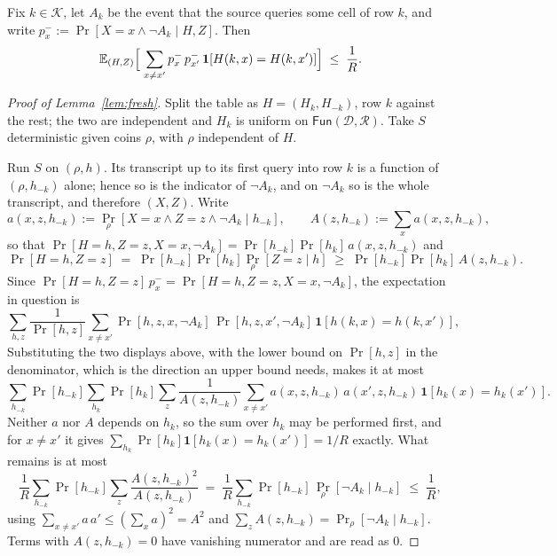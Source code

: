 \documentclass{aicr-solution}
\newcommand{\Fun}{\mathsf{Fun}}
\newcommand{\calK}{\mathcal{K}}
\newcommand{\calD}{\mathcal{D}}
\newcommand{\calR}{\mathcal{R}}
\begin{document}
\begin{lemma}\label{lem:fresh}
Fix $k \in \calK$, let $A_k$ be the event that the source queries some cell of row $k$, and write
$p^{-}_{x} := \Pr[X = x \wedge \neg A_k \mid H, Z]$. Then
\[
  \mathbb{E}_{(H,Z)}\Bigl[\;\sum_{x \neq x'} p^{-}_{x}\,p^{-}_{x'}\,
    \mathbf{1}[H(k,x) = H(k,x')]\Bigr] \;\le\; \frac1R .
\]
\end{lemma}
\begin{proof}[Proof of Lemma~\ref{lem:fresh}]
Split the table as $H = (H_k, H_{-k})$, row $k$ against the rest; the two are independent and $H_k$
is uniform on $\Fun(\calD,\calR)$. Take $S$ deterministic given coins $\rho$, with $\rho$
independent of $H$.

Run $S$ on $(\rho, h)$. Its transcript up to its first query into row $k$ is a function of
$(\rho, h_{-k})$ alone; hence so is the indicator of $\neg A_k$, and on $\neg A_k$ so is the whole
transcript, and therefore $(X,Z)$. Write
\[
  a(x,z,h_{-k}) := \Pr_{\rho}[X = x \wedge Z = z \wedge \neg A_k \mid h_{-k}] ,
  \qquad
  A(z,h_{-k}) := \sum_{x} a(x,z,h_{-k}) ,
\]
so that $\Pr[H = h, Z = z, X = x, \neg A_k] = \Pr[h_{-k}]\Pr[h_k]\,a(x,z,h_{-k})$ and
\[
  \Pr[H = h, Z = z] \;=\; \Pr[h_{-k}]\Pr[h_k]\Pr_\rho[Z = z \mid h]
  \;\ge\; \Pr[h_{-k}]\Pr[h_k]\,A(z,h_{-k}) .
\]
Since $\Pr[H=h,Z=z]\,p^{-}_{x} = \Pr[H=h,Z=z,X=x,\neg A_k]$, the expectation in question is
\[
  \sum_{h,z} \frac{1}{\Pr[h,z]} \sum_{x \neq x'}
    \Pr[h,z,x,\neg A_k]\,\Pr[h,z,x',\neg A_k]\,\mathbf{1}[h(k,x) = h(k,x')] ,
\]
Substituting the two displays above, with the lower bound on $\Pr[h,z]$ in the denominator, which
is the direction an upper bound needs, makes it at most
\[
  \sum_{h_{-k}} \Pr[h_{-k}] \sum_{h_k} \Pr[h_k] \sum_{z} \frac{1}{A(z,h_{-k})}
    \sum_{x \neq x'} a(x,z,h_{-k})\,a(x',z,h_{-k})\,\mathbf{1}[h_k(x) = h_k(x')] .
\]
Neither $a$ nor $A$ depends on $h_k$, so the sum over $h_k$ may be performed first, and for
$x \neq x'$ it gives $\sum_{h_k}\Pr[h_k]\mathbf{1}[h_k(x) = h_k(x')] = 1/R$ exactly. What remains is
at most
\[
  \frac1R \sum_{h_{-k}}\Pr[h_{-k}] \sum_z \frac{A(z,h_{-k})^2}{A(z,h_{-k})}
  \;=\; \frac1R \sum_{h_{-k}}\Pr[h_{-k}]\,\Pr_\rho[\neg A_k \mid h_{-k}] \;\le\; \frac1R ,
\]
using $\sum_{x\neq x'} a\,a' \le (\sum_x a)^2 = A^2$ and $\sum_z A(z,h_{-k}) =
\Pr_\rho[\neg A_k \mid h_{-k}]$. Terms with $A(z,h_{-k}) = 0$ have vanishing numerator and are read
as $0$.
\end{proof}
\end{document}
